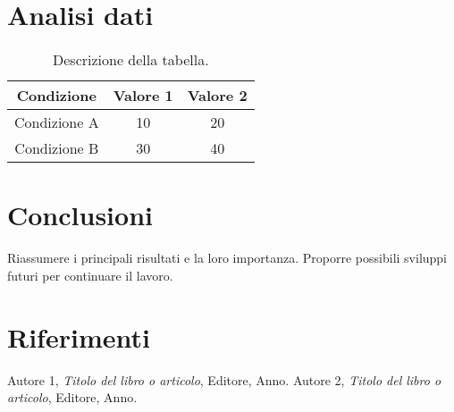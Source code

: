 \documentclass[a4paper,12pt]{article}
\begin{document}
	\section{Analisi dati}
	
	
	\begin{table}[h!]
		\centering
		\begin{tabular}{|c|c|c|}
			\hline
			Condizione & Valore 1 & Valore 2 \\
			\hline
			Condizione A & 10 & 20 \\
			\hline
			Condizione B & 30 & 40 \\
			\hline
		\end{tabular}
		\caption{Descrizione della tabella.}
		\label{tab:label}
	\end{table}
	
	
	\section{Conclusioni}
	Riassumere i principali risultati e la loro importanza. Proporre possibili sviluppi futuri per continuare il lavoro.
	
	\section{Riferimenti}
	\begin{thebibliography}{9}
		Autore 1, \textit{Titolo del libro o articolo}, Editore, Anno.
		Autore 2, \textit{Titolo del libro o articolo}, Editore, Anno.
	\end{thebibliography}
	
\end{document}
